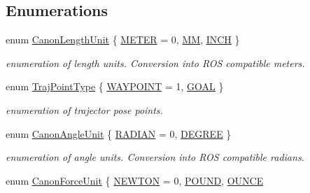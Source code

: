 \subsection*{Enumerations}
\begin{DoxyCompactItemize}
\item 
enum \hyperlink{namespaceRCS_a768c9d3a7f0e5850bc61ebede4b85b23}{Canon\-Length\-Unit} \{ \hyperlink{namespaceRCS_a768c9d3a7f0e5850bc61ebede4b85b23ae6d96128754284c45e005b02fe54b79d}{M\-E\-T\-E\-R} = 0, 
\hyperlink{namespaceRCS_a768c9d3a7f0e5850bc61ebede4b85b23ab9e0fafa9c10ccca32bcdcd1eb9813c1}{M\-M}, 
\hyperlink{namespaceRCS_a768c9d3a7f0e5850bc61ebede4b85b23a0b9c2e89e6353c26a8bab5661da20f6d}{I\-N\-C\-H}
 \}
\begin{DoxyCompactList}\small\item\em enumeration of length units. Conversion into R\-O\-S compatible meters. \end{DoxyCompactList}\item 
enum \hyperlink{namespaceRCS_ae705dbb4b887b18fef40316b6d5ca2c9}{Traj\-Point\-Type} \{ \hyperlink{namespaceRCS_ae705dbb4b887b18fef40316b6d5ca2c9a255760a7e92a5d130681fc75e280cb61}{W\-A\-Y\-P\-O\-I\-N\-T} = 1, 
\hyperlink{namespaceRCS_ae705dbb4b887b18fef40316b6d5ca2c9ab5c3606954a689ebe5425f6c2c09b970}{G\-O\-A\-L}
 \}
\begin{DoxyCompactList}\small\item\em enumeration of trajector pose points. \end{DoxyCompactList}\item 
enum \hyperlink{namespaceRCS_ad07ee9a15612cae458796cf946e36410}{Canon\-Angle\-Unit} \{ \hyperlink{namespaceRCS_ad07ee9a15612cae458796cf946e36410ad82b65c17877cfe8789becb230386fe5}{R\-A\-D\-I\-A\-N} = 0, 
\hyperlink{namespaceRCS_ad07ee9a15612cae458796cf946e36410aa2c86ef15e4232944a9f2085f3f68661}{D\-E\-G\-R\-E\-E}
 \}
\begin{DoxyCompactList}\small\item\em enumeration of angle units. Conversion into R\-O\-S compatible radians. \end{DoxyCompactList}\item 
enum \hyperlink{namespaceRCS_a7ab3ac05af337215785442dc8570c00f}{Canon\-Force\-Unit} \{ \hyperlink{namespaceRCS_a7ab3ac05af337215785442dc8570c00fadefb2cf80f2a6761a24dc6ffc2f15bbd}{N\-E\-W\-T\-O\-N} = 0, 
\hyperlink{namespaceRCS_a7ab3ac05af337215785442dc8570c00fa50e031587d5ce89d8b76aa114d5516c0}{P\-O\-U\-N\-D}, 
\hyperlink{namespaceRCS_a7ab3ac05af337215785442dc8570c00fa525cee8c6112d4cb86dec3aa0e6caba0}{O\-U\-N\-C\-E}

\end{DoxyCompactItemize}
